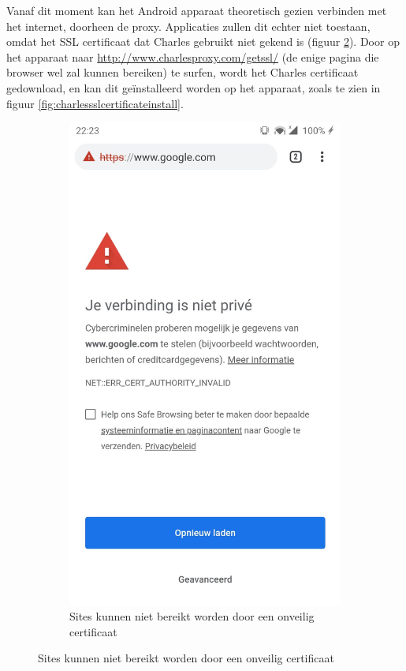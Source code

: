 Vanaf dit moment kan het Android apparaat theoretisch gezien verbinden met het internet, doorheen de proxy. Applicaties zullen dit echter niet toestaan, omdat het SSL certificaat dat Charles gebruikt niet gekend is (figuur \ref{fig:charlescantconnect}). Door op het apparaat naar \url{http://www.charlesproxy.com/getssl/} (de enige pagina die browser wel zal kunnen bereiken) te surfen, wordt het Charles certificaat gedownload, en kan dit geïnstalleerd worden op het apparaat, zoals te zien in figuur \ref{fig:charlessslcertificateinstall}.

\begin{figure}
    \centering
    \begin{subfigure}{.5\textwidth}
        \centering
        \includegraphics[width=0.8\linewidth]{img/charlescantconnect.jpg}
        \caption{Sites kunnen niet bereikt worden door een onveilig certificaat}
        \label{fig:charlescantconnect}

\end{subfigure}
\end{figure}
